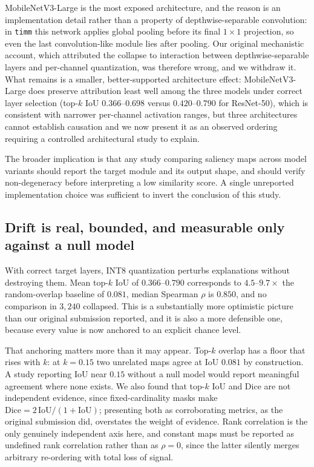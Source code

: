 \documentclass[fleqn,10pt]{wlscirep}
\begin{document}
MobileNetV3-Large is the most exposed architecture, and the reason is an implementation detail rather than a property of depthwise-separable convolution: in \texttt{timm} this network applies global pooling before its final $1 \times 1$ projection, so even the last convolution-like module lies after pooling. Our original mechanistic account, which attributed the collapse to interaction between depthwise-separable layers and per-channel quantization, was therefore wrong, and we withdraw it. What remains is a smaller, better-supported architecture effect: MobileNetV3-Large does preserve attribution least well among the three models under correct layer selection (top-$k$ IoU $0.366$--$0.698$ versus $0.420$--$0.790$ for ResNet-50), which is consistent with narrower per-channel activation ranges, but three architectures cannot establish causation and we now present it as an observed ordering requiring a controlled architectural study to explain.

The broader implication is that any study comparing saliency maps across model variants should report the target module and its output shape, and should verify non-degeneracy before interpreting a low similarity score. A single unreported implementation choice was sufficient to invert the conclusion of this study.

\subsection*{Drift is real, bounded, and measurable only against a null model}

With correct target layers, INT8 quantization perturbs explanations without destroying them. Mean top-$k$ IoU of $0.366$--$0.790$ corresponds to $4.5$--$9.7\times$ the random-overlap baseline of $0.081$, median Spearman $\rho$ is $0.850$, and no comparison in $3{,}240$ collapsed. This is a substantially more optimistic picture than our original submission reported, and it is also a more defensible one, because every value is now anchored to an explicit chance level.

That anchoring matters more than it may appear. Top-$k$ overlap has a floor that rises with $k$: at $k = 0.15$ two unrelated maps agree at IoU $0.081$ by construction. A study reporting IoU near $0.15$ without a null model would report meaningful agreement where none exists. We also found that top-$k$ IoU and Dice are not independent evidence, since fixed-cardinality masks make $\text{Dice} = 2\,\text{IoU}/(1+\text{IoU})$; presenting both as corroborating metrics, as the original submission did, overstates the weight of evidence. Rank correlation is the only genuinely independent axis here, and constant maps must be reported as undefined rank correlation rather than as $\rho = 0$, since the latter silently merges arbitrary re-ordering with total loss of signal.
\end{document}
